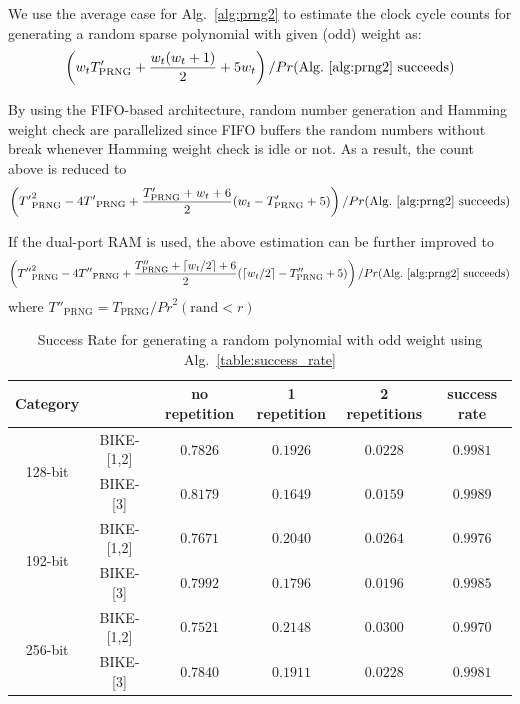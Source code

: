 \documentclass[runningheads]{llncs}
\begin{document}
We use the average case for Alg.~\ref{alg:prng2} to estimate the clock cycle counts for generating a random sparse polynomial with given (odd) weight as:
\[
   \left(w_tT'_{\text{PRNG}} + \frac{w_t(w_t+1)}{2} + 5w_t\right)/Pr(\text{Alg.~\ref{alg:prng2} succeeds})
\]

By using the FIFO-based architecture, random number generation and Hamming weight check are parallelized since FIFO buffers the random numbers without break whenever Hamming weight check is idle or not. As a result, the count above is reduced to
\[
    \left({T'}_{\text{PRNG}}^2 - 4{T'}_{\text{PRNG}} + \frac{T'_{\text{PRNG}}+w_t+6}{2}(w_t-T'_{\text{PRNG}}+5)\right)/Pr(\text{Alg.~\ref{alg:prng2} succeeds})
\]

If the dual-port RAM is used, the above estimation can be further improved to
\[
    \left({T''}_{\text{PRNG}}^2 - 4{T''}_{\text{PRNG}} + \frac{T''_{\text{PRNG}}+\lceil w_t/2\rceil+6}{2}(\lceil w_t/2\rceil-T''_{\text{PRNG}}+5)\right)/Pr(\text{Alg.~\ref{alg:prng2} succeeds})
\]
where ${T''}_{\text{PRNG}}=T_{\text{PRNG}}/{Pr}^2(\text{rand} < r)$

\begin{table}[!tb]\centering
\caption{Success Rate for generating a random polynomial with odd weight using Alg.~\ref{table:success_rate}}
\begin{tabular}{cc|cccc}
  \hline
 \textbf{Category}        &             & no repetition & 1 repetition & 2 repetitions & success rate \\\hline
\multirow{ 2}{*}{128-bit} &  BIKE-[1,2] & $0.7826$ & $0.1926$  & $0.0228$  & $0.9981$\\
                    &  BIKE-[3] & $0.8179$ & $0.1649$  & $0.0159$  & $0.9989$\\
  \hline
\multirow{ 2}{*}{192-bit} &  BIKE-[1,2] & $0.7671$ & $0.2040$  & $0.0264$  & $0.9976$\\
                    &  BIKE-[3] & $0.7992$ & $0.1796$  & $0.0196$  & $0.9985$\\
  \hline
\multirow{ 2}{*}{256-bit} &  BIKE-[1,2] & $0.7521$ & $0.2148$  & $0.0300$  & $0.9970$\\
                    &  BIKE-[3] & $0.7840$ & $0.1911$  & $0.0228$  & $0.9981$\\
  \hline
\end{tabular}
\end{table}
\end{document}
